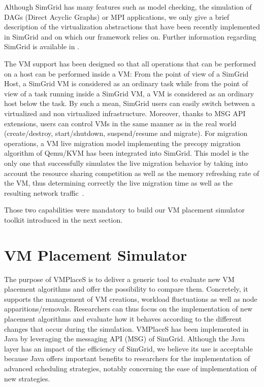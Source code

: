 \documentclass[conference]{IEEEtran}
\newcommand{\sg}{SimGrid\xspace}
\newcommand{\vmps}{VMPlaceS\xspace}
\begin{document}
Although SimGrid has many features such as model checking, the
simulation of DAGs (Direct Acyclic Graphs) or MPI applications, we
only give a brief description of the  virtualization  abstractions
that have been recently implemented in \sg and on which our framework relies
on.  Further information regarding \sg is available in \cite{casanova:hal-01017319}.

The VM support has been designed so that all operations that can be performed
on a host can be performed inside a VM: From the point of view of a \sg
Host, a \sg VM is considered as an ordinary task while from the point
of view of a task running inside a \sg VM, a VM is considered as an
ordinary host below the task.  By such a mean, \sg users can easily
switch between a virtualized and non virtualized infrastructure.
Moreover, thanks to  MSG API extensions, users can control VMs in the
same manner as in the real world (\eg create/destroy, start/shutdown,
suspend/resume and migrate).
For migration operations, a VM live migration model implementing the
precopy migration algorithm of Qemu/KVM has been integrated into \sg.
This model is the only one that successfully simulates the live
migration behavior by taking into account the resource sharing
competition as well as the memory refreshing rate of the VM, thus
determining correctly the live migration time as well as the resulting
network traffic~\cite{Hirofuchi:2013:ALM:2568486.2568524}.

Those two capabilities were mandatory to build our VM placement
simulator toolkit introduced in the next section.

\section{VM Placement Simulator}
\label{sec:injector}

The purpose of \vmps is to deliver a generic tool to evaluate new VM
placement algorithms and offer the possibility to compare
them. Concretely, it supports the management of VM creations, workload
fluctuations as well as node apparitions/removals.  Researchers can
thus focus on the implementation of new placement algorithms and
evaluate how it behaves according to the different changes that occur
during the simulation.
%
\vmps has been implemented in Java by leveraging the messaging API
(MSG) of \sg.  Although the Java layer has an impact of the efficiency
of \sg, we believe its use is acceptable because Java offers important
benefits to researchers for the implementation of advanced scheduling
strategies, notably concerning the ease of implementation of new
strategies. 
\end{document}
